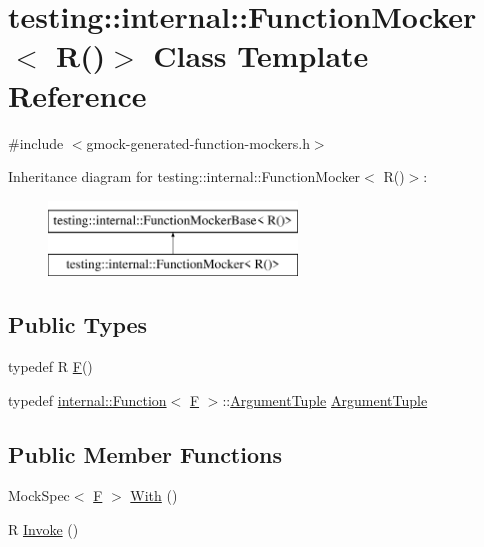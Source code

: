 \hypertarget{classtesting_1_1internal_1_1FunctionMocker_3_01R_07_08_4}{}\section{testing\+::internal\+::Function\+Mocker$<$ R()$>$ Class Template Reference}
\label{classtesting_1_1internal_1_1FunctionMocker_3_01R_07_08_4}


{\ttfamily \#include $<$gmock-\/generated-\/function-\/mockers.\+h$>$}

Inheritance diagram for testing\+::internal\+::Function\+Mocker$<$ R()$>$\+:\begin{figure}[H]
\begin{center}
\leavevmode
\includegraphics[height=2.000000cm]{classtesting_1_1internal_1_1FunctionMocker_3_01R_07_08_4}
\end{center}
\end{figure}
\subsection*{Public Types}
\begin{DoxyCompactItemize}
\item 
typedef R \mbox{\hyperlink{classtesting_1_1internal_1_1FunctionMocker_3_01R_07_08_4_a2c1d7da413176d87405227df90a95521}{F}}()
\item 
typedef \mbox{\hyperlink{structtesting_1_1internal_1_1Function}{internal\+::\+Function}}$<$ \mbox{\hyperlink{classtesting_1_1internal_1_1FunctionMocker_3_01R_07_08_4_a2c1d7da413176d87405227df90a95521}{F}} $>$\+::\mbox{\hyperlink{classtesting_1_1internal_1_1FunctionMocker_3_01R_07_08_4_a5a279e0d8414bf0809405c06a0725b66}{Argument\+Tuple}} \mbox{\hyperlink{classtesting_1_1internal_1_1FunctionMocker_3_01R_07_08_4_a5a279e0d8414bf0809405c06a0725b66}{Argument\+Tuple}}
\end{DoxyCompactItemize}
\subsection*{Public Member Functions}
\begin{DoxyCompactItemize}
\item 
Mock\+Spec$<$ \mbox{\hyperlink{classtesting_1_1internal_1_1FunctionMocker_3_01R_07_08_4_a2c1d7da413176d87405227df90a95521}{F}} $>$ \mbox{\hyperlink{classtesting_1_1internal_1_1FunctionMocker_3_01R_07_08_4_a4bd0ee604f6917fcfe8aae52a1f47cf3}{With}} ()
\item 
R \mbox{\hyperlink{classtesting_1_1internal_1_1FunctionMocker_3_01R_07_08_4_a8096a10aea2ffc6a78d0437855d2ef10}{Invoke}} ()
\end{DoxyCompactItemize}


